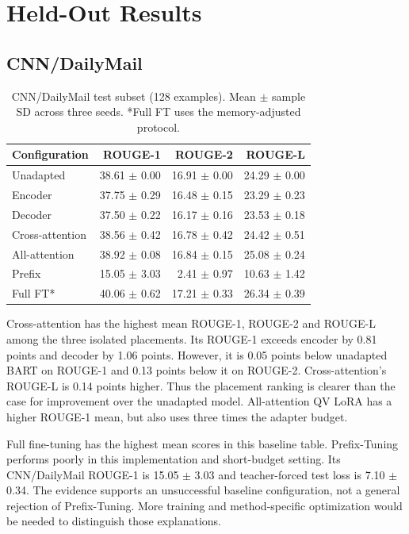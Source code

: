 \documentclass[11pt,letterpaper]{article}
\begin{document}
\section{Held-Out Results}
\subsection{CNN/DailyMail}
\begin{table}[H]
\centering
\small
\begin{tabular}{lrrr}\toprule Configuration & ROUGE-1 & ROUGE-2 & ROUGE-L\\\midrule
Unadapted & 38.61 $\pm$ 0.00 & 16.91 $\pm$ 0.00 & 24.29 $\pm$ 0.00\\
Encoder & 37.75 $\pm$ 0.29 & 16.48 $\pm$ 0.15 & 23.29 $\pm$ 0.23\\
Decoder & 37.50 $\pm$ 0.22 & 16.17 $\pm$ 0.16 & 23.53 $\pm$ 0.18\\
Cross-attention & 38.56 $\pm$ 0.42 & 16.78 $\pm$ 0.42 & 24.42 $\pm$ 0.51\\
All-attention & 38.92 $\pm$ 0.08 & 16.84 $\pm$ 0.15 & 25.08 $\pm$ 0.24\\
Prefix & 15.05 $\pm$ 3.03 & 2.41 $\pm$ 0.97 & 10.63 $\pm$ 1.42\\
Full FT* & 40.06 $\pm$ 0.62 & 17.21 $\pm$ 0.33 & 26.34 $\pm$ 0.39\\
\bottomrule\end{tabular}
\caption{CNN/DailyMail test subset (128 examples). Mean $\pm$ sample SD across three seeds. *Full FT uses the memory-adjusted protocol.}
\end{table}

Cross-attention has the highest mean ROUGE-1, ROUGE-2 and ROUGE-L among the three isolated placements. Its ROUGE-1 exceeds encoder by 0.81 points and decoder by 1.06 points. However, it is 0.05 points below unadapted BART on ROUGE-1 and 0.13 points below it on ROUGE-2. Cross-attention's ROUGE-L is 0.14 points higher. Thus the placement ranking is clearer than the case for improvement over the unadapted model. All-attention QV LoRA has a higher ROUGE-1 mean, but also uses three times the adapter budget.

Full fine-tuning has the highest mean scores in this baseline table. Prefix-Tuning performs poorly in this implementation and short-budget setting. Its CNN/DailyMail ROUGE-1 is 15.05 $\pm$ 3.03 and teacher-forced test loss is 7.10 $\pm$ 0.34. The evidence supports an unsuccessful baseline configuration, not a general rejection of Prefix-Tuning. More training and method-specific optimization would be needed to distinguish those explanations.
\end{document}
